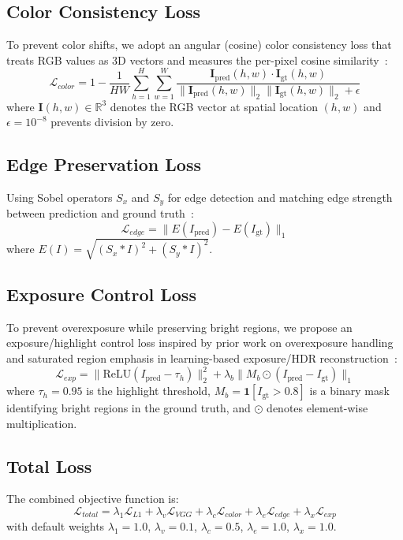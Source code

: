\documentclass[sigconf]{acmart}
\begin{document}
\subsection{Color Consistency Loss}
To prevent color shifts, we adopt an angular (cosine) color consistency loss that treats RGB values as 3D vectors and measures the per-pixel cosine similarity~\cite{park2023dualcolor}:
\begin{equation}
\mathcal{L}_{color} = 1 - \frac{1}{HW}\sum_{h=1}^{H}\sum_{w=1}^{W} 
\frac{\mathbf{I}_{\text{pred}}(h,w) \cdot \mathbf{I}_{\text{gt}}(h,w)}
{\|\mathbf{I}_{\text{pred}}(h,w)\|_2 \|\mathbf{I}_{\text{gt}}(h,w)\|_2 + \epsilon}
\end{equation}
where $\mathbf{I}(h,w) \in \mathbb{R}^3$ denotes the RGB vector at spatial 
location $(h,w)$ and $\epsilon=10^{-8}$ prevents division by zero.

\subsection{Edge Preservation Loss}
Using Sobel operators $S_x$ and $S_y$ for edge detection and matching edge strength between prediction and ground truth~\cite{edrnet2025edgematching}:
\begin{equation}
\mathcal{L}_{edge} = \|E(I_{\text{pred}}) - E(I_{\text{gt}})\|_1
\end{equation}
where $E(I) = \sqrt{(S_x * I)^2 + (S_y * I)^2}$.

\subsection{Exposure Control Loss}
To prevent overexposure while preserving bright regions, we propose an exposure/highlight control loss inspired by prior work on overexposure handling and saturated region emphasis in learning-based exposure/HDR reconstruction~\cite{rlunet2024overexposure,afifi2021exposurecorrection,lee2022hsvnet,eilertsen2017singlehdr}:
\begin{equation}
\mathcal{L}_{exp} = \|\text{ReLU}(I_{\text{pred}} - \tau_h)\|_2^2 + 
\lambda_b \|M_b \odot (I_{\text{pred}} - I_{\text{gt}})\|_1
\end{equation}
where $\tau_h = 0.95$ is the highlight threshold, 
$M_b = \mathbf{1}[I_{\text{gt}} > 0.8]$ is a binary mask identifying 
bright regions in the ground truth, and $\odot$ denotes element-wise multiplication.

\subsection{Total Loss}
The combined objective function is:
\begin{equation}
\mathcal{L}_{total} = \lambda_1 \mathcal{L}_{L1} + \lambda_v \mathcal{L}_{VGG} + \lambda_c \mathcal{L}_{color} + \lambda_e \mathcal{L}_{edge} + \lambda_x \mathcal{L}_{exp}
\end{equation}
with default weights $\lambda_1 = 1.0$, $\lambda_v = 0.1$, $\lambda_c = 0.5$, $\lambda_e = 1.0$, $\lambda_x = 1.0$.
\end{document}
